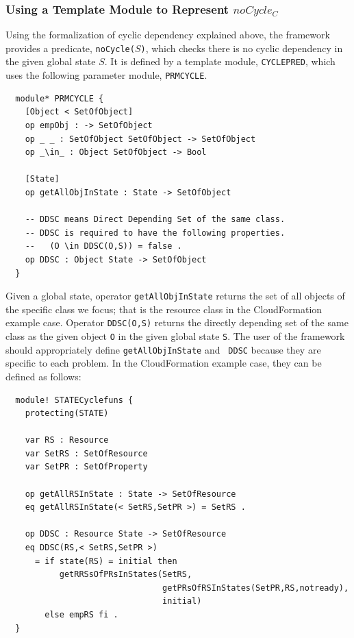 \documentclass[12pt]{report}
\newcommand{\stt}[1]{{\small{\tt {#1}}}}
\begin{document}
\subsubsection{Using a Template Module to Represent $noCycle_C$}
Using the formalization of cyclic dependency explained above, the
framework provides a predicate, \stt{noCycle($S$)}, which checks there
is no cyclic dependency in the given global state $S$. It is defined
by a template module, {\tt CYCLEPRED}, which uses the following
parameter module, {\tt PRMCYCLE}.
\small
\begin{verbatim}
  module* PRMCYCLE {
    [Object < SetOfObject]
    op empObj : -> SetOfObject
    op _ _ : SetOfObject SetOfObject -> SetOfObject
    op _\in_ : Object SetOfObject -> Bool
  
    [State]
    op getAllObjInState : State -> SetOfObject
  
    -- DDSC means Direct Depending Set of the same class.
    -- DDSC is required to have the following properties.
    --   (O \in DDSC(O,S)) = false .
    op DDSC : Object State -> SetOfObject
  }
\end{verbatim}
\normalsize
Given a global state, operator {\tt getAllObjInState} returns the set
of all objects of the specific class we focus; that is the resource
class in the CloudFormation example case. Operator \stt{DDSC(O,S)}
returns the directly depending set of the same class as the given
object {\tt O} in the given global state {\tt S}. The user of the
framework should appropriately define {\tt getAllObjInState} and {\tt
  DDSC} because they are specific to each problem. In the
CloudFormation example case, they can be defined as follows:
\small
\begin{verbatim}
  module! STATECyclefuns {
    protecting(STATE)
  
    var RS : Resource
    var SetRS : SetOfResource
    var SetPR : SetOfProperty
  
    op getAllRSInState : State -> SetOfResource
    eq getAllRSInState(< SetRS,SetPR >) = SetRS .
  
    op DDSC : Resource State -> SetOfResource
    eq DDSC(RS,< SetRS,SetPR >)
      = if state(RS) = initial then
           getRRSsOfPRsInStates(SetRS,
                                getPRsOfRSInStates(SetPR,RS,notready),
                                initial)
        else empRS fi .
  }
\end{verbatim}
\end{document}
